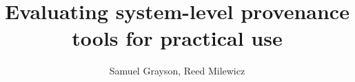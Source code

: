 \documentclass{article}
\begin{document}
\title{Evaluating system-level provenance tools for practical use}
\author{Samuel Grayson, Reed Milewicz}
\maketitle

\printbibliography
\end{document}
